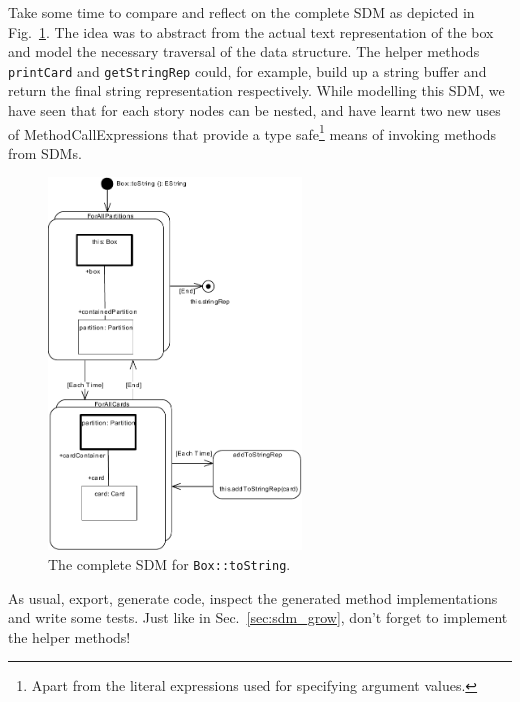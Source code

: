 Take some time to compare and reflect on the complete SDM as depicted in
Fig.~\ref{fig:sdm_tostring_5}.  The idea was to abstract from the actual text
representation of the box and model the necessary traversal of the data
structure.  The helper methods \texttt{printCard} and
\texttt{getStringRep} could, for example, build up a string buffer and return
the final string representation respectively.  While modelling this SDM, we have
seen that for each story nodes can be nested, and have learnt two new uses of
MethodCallExpressions that provide a type safe\footnote{Apart from the literal
expressions used for specifying argument values.} means of invoking methods from
SDMs.

\begin{figure}[htbp]
\begin{center}
  \includegraphics[width=0.6\textwidth]{pics/sdmBilder/toString/sdm76.pdf}
  \caption{The complete SDM for \texttt{Box::toString}.}  
  \label{fig:sdm_tostring_5}
\end{center}
\end{figure}

As usual, export, generate code, inspect the generated method implementations
and write some tests.  Just like in Sec.~\ref{sec:sdm_grow}, don't forget to
implement the helper methods!
